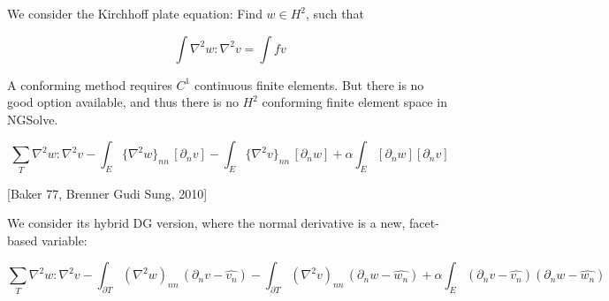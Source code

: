 We consider the Kirchhoff plate equation: Find $w \in H^2$, such that

$$
\int \nabla^2 w : \nabla^2 v = \int f v
$$

A conforming method requires $C^1$ continuous finite elements. But there is no good option available, and thus there is no $H^2$ conforming finite element space in NGSolve.

$$
\sum_T \nabla^2 w : \nabla^2 v
- \int_{E} \{\nabla^2 w\}_{nn} \, [\partial_n v]
- \int_{E} \{\nabla^2 v\}_{nn} \, [\partial_n w] + \alpha \int_E  [\partial_n w]  [\partial_n v]
$$

[Baker 77, Brenner Gudi Sung, 2010]

We consider its hybrid DG version, where the normal derivative is a new, facet-based variable:

$$
\sum_T \nabla^2 w : \nabla^2 v
- \int_{\partial T} (\nabla^2 w)_{nn} \, (\partial_n v - \widehat{v_n})
- \int_{\partial T} (\nabla^2 v)_{nn} \, (\partial_n w - \widehat{w_n}) + \alpha \int_E (\partial_n v - \widehat{v_n}) (\partial_n w - \widehat{w_n})
$$




